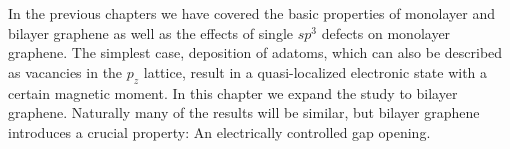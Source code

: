%

In the previous chapters we have covered the basic properties of monolayer and bilayer graphene as well as the effects of single $sp^3$ defects on monolayer graphene. The simplest case, deposition of  adatoms, which can also be described as vacancies in the $p_z$ lattice, result in a quasi-localized electronic state with a certain magnetic moment. In this chapter we expand the study to bilayer graphene. Naturally many of the results will be similar, but bilayer graphene introduces a crucial property: An electrically controlled gap opening.


